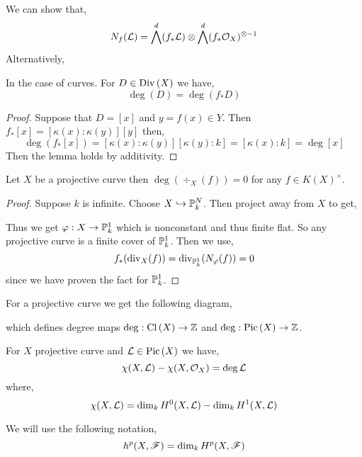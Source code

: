 \documentclass[12pt]{article}
\begin{document}
\begin{rmk}
We can show that,
\[ N_f(\L) = \bigwedge^d (f_* \L) \otimes \bigwedge^d (f_* \struct{X})^{\otimes -1} \]
Alternatively, 
\end{rmk}

\begin{lemma}
In the case of curves. For $D \in \Div{X}$ we have,
\[ \deg{(D)} = \deg{(f_* D)} \]
\end{lemma}

\begin{proof}
Suppose that $D = [x]$ and $y = f(x) \in Y$. Then $f_* [x] = [\kappa(x) : \kappa(y)] [y]$ then,
\[ \deg{(f_* [x])} = [\kappa(x) : \kappa(y)] [\kappa(y) : k] = [\kappa(x) : k] = \deg{[x]} \]
Then the lemma holds by additivity. 
\end{proof}

\begin{cor}
Let $X$ be a projective curve then $\deg{(\div_X(f))} = 0$ for any $f \in K(X)^\times$.
\end{cor}

\begin{proof}
Suppose $k$ is infinite. Choose $X \embed \P_k^N$. Then project away from $X$ to get,
\begin{center}
\end{center}
Thus we get $\varphi : X \to \P^1_k$ which is nonconstant and thus finite flat. So any projective curve is a finite cover of $\P^1_k$. Then we use,
\[ f_* (\div_X(f)) = \div_{\P^1_k}(N_\varphi(f)) = 0 \]
since we have proven the fact for $\P^1_k$. 
\end{proof}

\begin{cor}
For a projective curve we get the following diagram,
\begin{center}
\end{center}
which defines degree maps $\deg : \Cl{X} \to \Z$ and $\deg : \Pic{X} \to \Z$. 
\end{cor}

\begin{theorem}
For $X$ projective curve and $\L \in \Pic{X}$ we have,
\[ \chi(X, \L) - \chi(X, \struct{X}) = \deg{\L} \]
where,
\[ \chi(X, \L) = \dim_k H^0(X, \L) - \dim_k H^1(X, \L) \]
\end{theorem}

\begin{rmk}
We will use the following notation,
\[ h^p(X, \F) = \dim_k H^p(X, \F) \]
\end{rmk}
\end{document}
